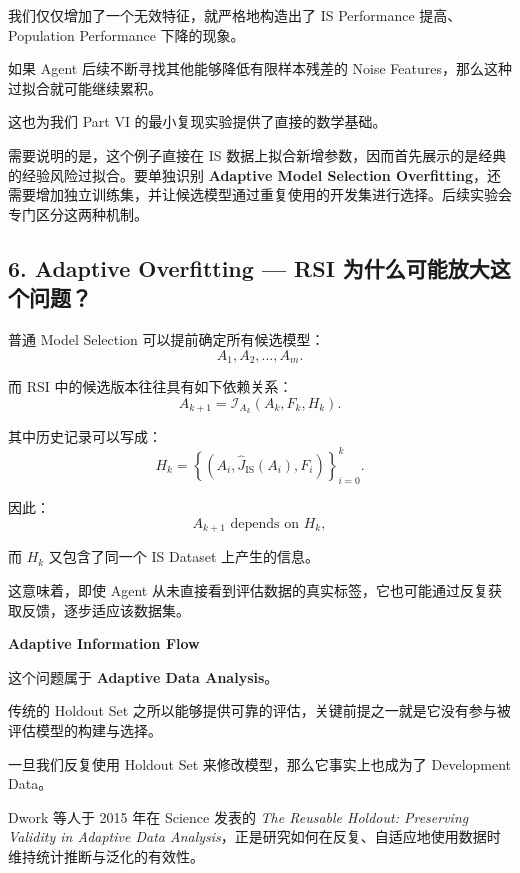 我们仅仅增加了一个无效特征，就严格地构造出了 IS Performance 提高、Population Performance 下降的现象。

如果 Agent 后续不断寻找其他能够降低有限样本残差的 Noise Features，那么这种过拟合就可能继续累积。

这也为我们 Part VI 的最小复现实验提供了直接的数学基础。

需要说明的是，这个例子直接在 IS 数据上拟合新增参数，因而首先展示的是经典的经验风险过拟合。要单独识别 \textbf{Adaptive Model Selection Overfitting}，还需要增加独立训练集，并让候选模型通过重复使用的开发集进行选择。后续实验会专门区分这两种机制。

\hypertarget{part-1-07-0001-adaptive-overfitting-rsi-ux4e3aux4ec0ux4e48ux53efux80fdux653eux5927ux8fd9ux4e2aux95eeux9898}{%
\subsection{6. Adaptive Overfitting --- RSI 为什么可能放大这个问题？}\label{part-1-07-0001-adaptive-overfitting-rsi-ux4e3aux4ec0ux4e48ux53efux80fdux653eux5927ux8fd9ux4e2aux95eeux9898}}

普通 Model Selection 可以提前确定所有候选模型：
\[A_1,A_2,\ldots,A_m.\]

而 RSI 中的候选版本往往具有如下依赖关系：
\[A_{k+1}
=
\mathcal I_{A_k}(A_k,F_k,H_k).\]

其中历史记录可以写成：
\[H_k=
\left\{
(A_i,\widehat J_{\mathrm{IS}}(A_i),F_i)
\right\}_{i=0}^{k}.\]

因此：
\[A_{k+1}
\text{ depends on }
H_k,\]

而 \(H_k\) 又包含了同一个 IS Dataset 上产生的信息。

这意味着，即使 Agent 从未直接看到评估数据的真实标签，它也可能通过反复获取反馈，逐步适应该数据集。

\textbf{Adaptive Information Flow}


这个问题属于 \textbf{Adaptive Data Analysis}。

传统的 Holdout Set 之所以能够提供可靠的评估，关键前提之一就是它没有参与被评估模型的构建与选择。

一旦我们反复使用 Holdout Set 来修改模型，那么它事实上也成为了 Development Data。

Dwork 等人于 2015 年在 Science 发表的 \emph{The Reusable Holdout: Preserving Validity in Adaptive Data Analysis}，正是研究如何在反复、自适应地使用数据时维持统计推断与泛化的有效性。

